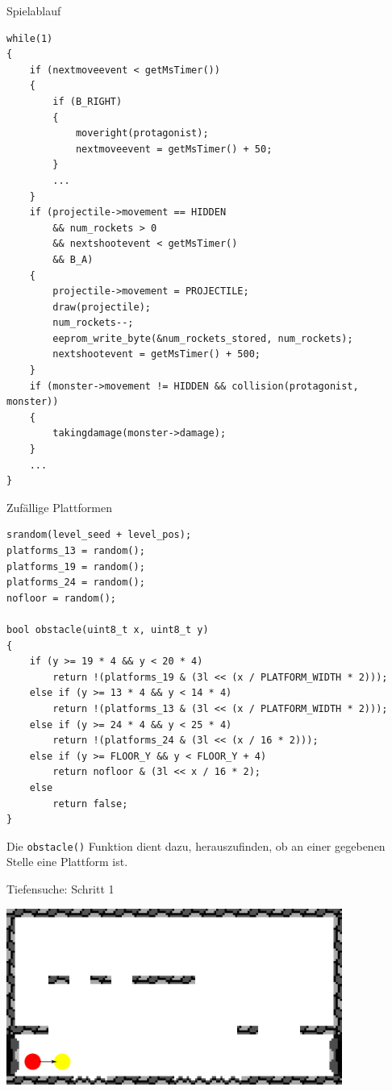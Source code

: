\documentclass[fleqn]{beamer}
\begin{document}
    \begin{frame}[fragile]{Spielablauf}
    \begin{verbatim}
while(1)
{
    if (nextmoveevent < getMsTimer())
    {
        if (B_RIGHT)
        {
            moveright(protagonist);
            nextmoveevent = getMsTimer() + 50;
        }
        ...
    }
    if (projectile->movement == HIDDEN
        && num_rockets > 0
        && nextshootevent < getMsTimer()
        && B_A)
    {
        projectile->movement = PROJECTILE;
        draw(projectile);
        num_rockets--;
        eeprom_write_byte(&num_rockets_stored, num_rockets);
        nextshootevent = getMsTimer() + 500;
    }
    if (monster->movement != HIDDEN && collision(protagonist, monster))
    {
        takingdamage(monster->damage);
    }
    ...
}    
    \end{verbatim}
    \end{frame}
    
        \begin{frame}[fragile]{Zufällige Plattformen}
    \begin{verbatim}
srandom(level_seed + level_pos);    
platforms_13 = random();
platforms_19 = random();
platforms_24 = random();   
nofloor = random();

bool obstacle(uint8_t x, uint8_t y)
{
    if (y >= 19 * 4 && y < 20 * 4)
        return !(platforms_19 & (3l << (x / PLATFORM_WIDTH * 2)));
    else if (y >= 13 * 4 && y < 14 * 4)
        return !(platforms_13 & (3l << (x / PLATFORM_WIDTH * 2)));
    else if (y >= 24 * 4 && y < 25 * 4)
        return !(platforms_24 & (3l << (x / 16 * 2)));
    else if (y >= FLOOR_Y && y < FLOOR_Y + 4)
        return nofloor & (3l << x / 16 * 2);
    else
        return false;
}
    \end{verbatim}
    Die \texttt{obstacle()} Funktion dient dazu, herauszufinden, ob an einer gegebenen Stelle eine Plattform ist.
    \end{frame}
    
    \begin{frame}{Tiefensuche: Schritt 1}
    		\begin{center}
    			\includegraphics[width=11cm]{Bilder/dfs1.png}
    		\end{center}
    \end{frame}
    
\end{document}
